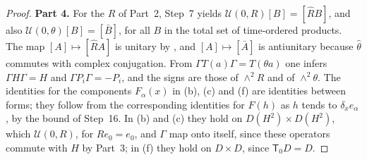 \documentclass[11pt,letterpaper,reqno]{amsart}
\theoremstyle{definition}
\begin{document}
\begin{proof}
\textbf{Part 4.}
For the $R$ of Part~2, Step~7 yields $\mathcal U(0,R)[B]=[\hat RB]$, and also $\mathcal U(0,\theta)[B]=[\bar B]$, for all $B$ in the total set of time-ordered products.
The map $[A]\mapsto[\hat RA]$ is unitary by \cite[Proposition~14.47\,(a)]{QEDII}, and $[A]\mapsto[\bar A]$ is antiunitary because $\hat\theta$ commutes with complex conjugation.
From $\Gamma T(a)\Gamma=T(\theta a)$ one infers $\Gamma H\Gamma=H$ and $\Gamma P_i\Gamma=-P_i$, and the signs are those of $\wedge^2R$ and of $\wedge^2\theta$.
The identities for the components $F_\alpha(x)$ in (b), (c) and (f) are identities between forms; they follow from the corresponding identities for $F(h)$ as $h$ tends to $\delta_xe_\alpha$, by the bound of Step~16.
In (b) and (c) they hold on $D(H^2)\times D(H^2)$, which $\mathcal U(0,R)$, for $Re_0=e_0$, and $\Gamma$ map onto itself, since these operators commute with $H$ by Part~3; in (f) they hold on $D\times D$, since $\mathsf T_0D=D$.


\end{proof}
\end{document}
